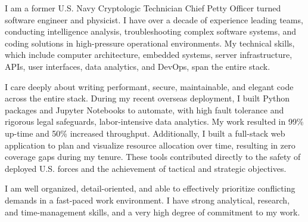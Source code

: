 \documentclass[11pt, a4paper]{coverletter}
\newenvironment{coverletter}{}{}
\begin{document}
\begin{header}
\address{Brooklyn, NY}
\mobile{}
\makeheader[C]
\end{header}
\begin{coverletter}
\begin{opening}
\makeletterstart
\end{opening}
\begin{body}
\setlength{\parindent}{0em}
\setlength{\parskip}{1em}
{\begin{clparagraphs}
\begin{clparagraph}
I am a former U.S. Navy Cryptologic Technician Chief Petty Officer turned software engineer and physicist. I have over a decade of experience leading teams, conducting intelligence analysis, troubleshooting complex software systems, and coding solutions in high-pressure operational environments. My technical skills, which include computer architecture, embedded systems, server infrastructure, APIs, user interfaces, data analytics, and DevOps, span the entire stack.
\end{clparagraph}
\end{clparagraphs}}
\setlength{\parindent}{0em}
\setlength{\parskip}{1em}
{\begin{clparagraphs}
\begin{clparagraph}
I care deeply about writing performant, secure, maintainable, and elegant code across the entire stack. During my recent overseas deployment, I built Python packages and Jupyter Notebooks to automate, with high fault tolerance and rigorous legal safeguards, labor-intensive data analytics. My work resulted in 99\% up-time and 50\% increased throughput. Additionally, I built a full-stack web application to plan and visualize resource allocation over time, resulting in zero coverage gaps during my tenure. These tools contributed directly to the safety of deployed U.S. forces and the achievement of tactical and strategic objectives.
\end{clparagraph}
\begin{clparagraph}
I am well organized, detail-oriented, and able to effectively prioritize conflicting demands in a fast-paced work environment. I have strong analytical, research, and time-management skills, and a very high degree of commitment to my work.

\end{clparagraph}
\end{clparagraphs}}
\end{body}
\end{coverletter}
\end{document}
